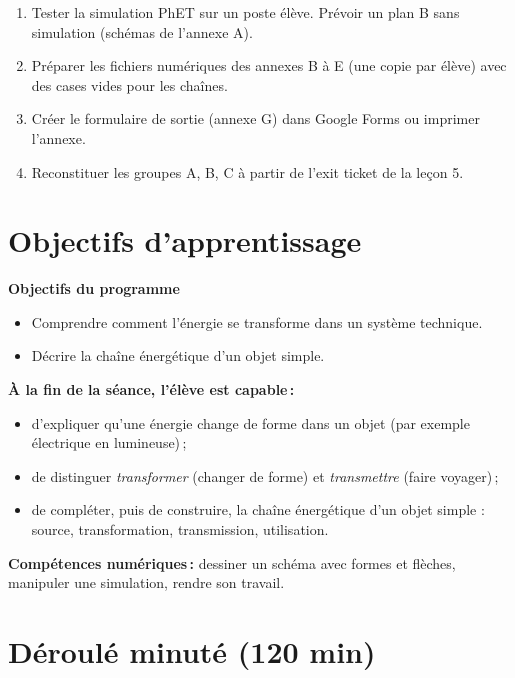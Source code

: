 \documentclass[11pt,a4paper]{article}
\begin{document}
\begin{astuce}
\begin{enumerate}
 \item Tester la simulation PhET sur un poste élève. Prévoir un plan B sans simulation (schémas de l'annexe A).
 \item Préparer les fichiers numériques des annexes B à E (une copie par élève) avec des cases vides pour les chaînes.
 \item Créer le formulaire de sortie (annexe G) dans Google Forms ou imprimer l'annexe.
 \item Reconstituer les groupes A, B, C à partir de l'exit ticket de la leçon 5.
\end{enumerate}
\end{astuce}

\section{Objectifs d'apprentissage}
\begin{tcolorbox}[colback=gray!8,colframe=gray!60!black,arc=1mm,boxrule=0.5pt]
\textbf{Objectifs du programme}
\begin{itemize}
 \item Comprendre comment l'énergie se transforme dans un système technique.
 \item Décrire la chaîne énergétique d'un objet simple.
\end{itemize}
\textbf{À la fin de la séance, l'élève est capable\,:}
\begin{itemize}
 \item d'expliquer qu'une énergie change de forme dans un objet (par exemple électrique en lumineuse)\,;
 \item de distinguer \emph{transformer} (changer de forme) et \emph{transmettre} (faire voyager)\,;
 \item de compléter, puis de construire, la chaîne énergétique d'un objet simple : source, transformation, transmission, utilisation.
\end{itemize}
\textbf{Compétences numériques\,:} dessiner un schéma avec formes et flèches, manipuler une simulation, rendre son travail.
\end{tcolorbox}

\section{Déroulé minuté (120 min)}
\end{document}

